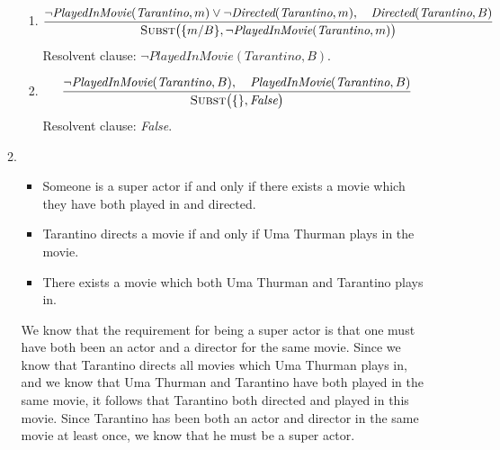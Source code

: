 \begin{enumerate}
\begin{enumerate}
\begin{enumerate}
\item
{\footnotesize
\begin{displaymath}
\frac{\neg \textit{PlayedInMovie}(\textit{Tarantino}, m) \lor \neg \textit{Directed}(\textit{Tarantino}, m), \quad \textit{Directed}(\textit{Tarantino}, B)}{\textsc{Subst}\big(\{m / B\}, \neg \textit{PlayedInMovie}(\textit{Tarantino}, m) \big)}
\end{displaymath}
}
Resolvent clause: $\neg \textit{PlayedInMovie}(\textit{Tarantino}, B)$.

\item
{\footnotesize
\begin{displaymath}
\frac{\neg \textit{PlayedInMovie}(\textit{Tarantino}, B), \quad \textit{PlayedInMovie}(\textit{Tarantino}, B)}{\textsc{Subst}\big(\{\}, \textit{False}\big)}
\end{displaymath}
}
Resolvent clause: \textit{False}.
\end{enumerate}

\item
\begin{itemize}
\item Someone is a super actor if and only if there exists a movie which they have both played in and directed.
\item Tarantino directs a movie if and only if Uma Thurman plays in the movie.
\item There exists a movie which both Uma Thurman and Tarantino plays in.
\end{itemize}

We know that the requirement for being a super actor is that one must have both been an actor and a director for the same movie. Since we know that Tarantino directs all movies which Uma Thurman plays in, and we know that Uma Thurman and Tarantino have both played in the same movie, it follows that Tarantino both directed and played in this movie. Since Tarantino has been both an actor and director in the same movie at least once, we know that he must be a super actor.
\end{enumerate}
\end{enumerate}


